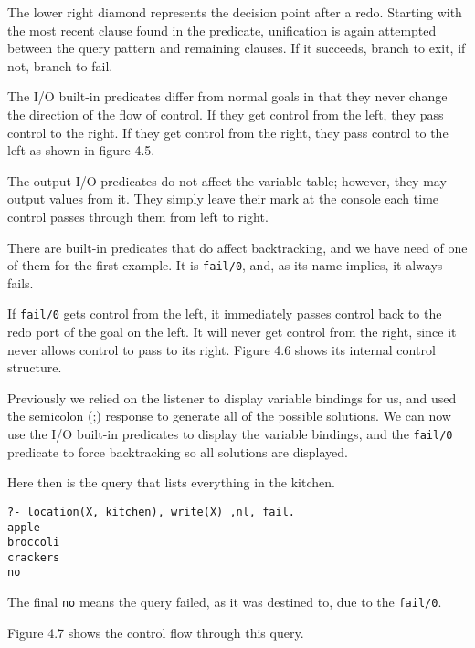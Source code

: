 The lower right diamond represents the decision point after a redo. Starting
with the most recent clause found in the predicate, unification is again
attempted between the query pattern and remaining clauses. If it succeeds,
branch to exit, if not, branch to fail.

The I/O built-in predicates differ from normal goals in that they never change
the direction of the flow of control. If they get control from the left, they
pass control to the right. If they get control from the right, they pass control
to the left as shown in figure 4.5.


The output I/O predicates do not affect the variable table; however, they may
output values from it. They simply leave their mark at the console each time
control passes through them from left to right.

There are built-in predicates that do affect backtracking, and we have need of
one of them for the first example. It is \verb|fail/0|, and, as its name
implies, it always fails.

If \verb|fail/0| gets control from the left, it immediately passes control back
to the redo port of the goal on the left. It will never get control from the
right, since it never allows control to pass to its right. Figure 4.6 shows its
internal control structure.


Previously we relied on the listener to display variable bindings for us, and
used the semicolon (;) response to generate all of the possible solutions. We
can now use the I/O built-in predicates to display the variable bindings, and
the \verb|fail/0| predicate to force backtracking so all solutions are
displayed.

Here then is the query that lists everything in the kitchen.
\begin{verbatim}
?- location(X, kitchen), write(X) ,nl, fail.
apple
broccoli
crackers
no
\end{verbatim}

The final \verb'no' means the query failed, as it was destined to, due to the
\verb|fail/0|.

Figure 4.7 shows the control flow through this query.

